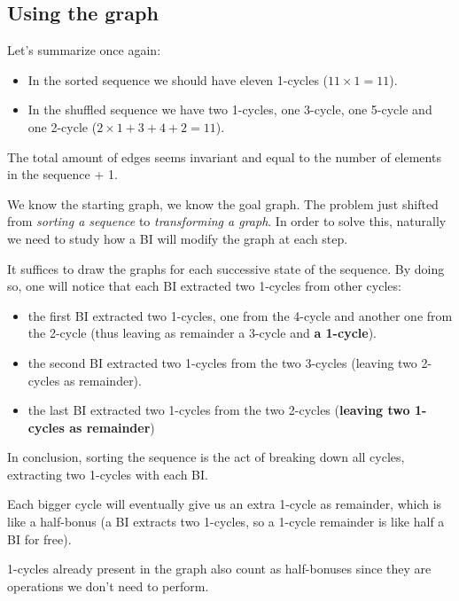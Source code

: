 \documentclass[11pt,final,twoside,nofrench]{thlifl}
\begin{document}
\subsection{Using the graph}

Let's summarize once again:

\begin{itemize}
\item In the sorted sequence we should have eleven 1-cycles ($11 \times 1 = 11$).

\item In the shuffled sequence we have two 1-cycles, one 3-cycle, one 5-cycle and one 2-cycle ($2 \times 1 + 3 + 4 + 2 = 11$).
\end{itemize}

The total amount of edges seems invariant and equal to the number of elements in the sequence + 1.

We know the starting graph, we know the goal graph. The problem just shifted from \emph{sorting a sequence} to \emph{transforming a graph}. In order to solve this, naturally we need to study how a BI will modify the graph at each step.

It suffices to draw the graphs for each successive state of the sequence. By doing so, one will notice that each BI extracted two 1-cycles from other cycles:

\begin{itemize}

\item the first BI extracted two 1-cycles, one from the 4-cycle and another one from the 2-cycle (thus leaving as remainder a 3-cycle and \textbf{a 1-cycle}).

\item the second BI extracted two 1-cycles from the two 3-cycles (leaving two 2-cycles as remainder).

\item the last BI extracted two 1-cycles from the two 2-cycles (\textbf{leaving two 1-cycles as remainder})

\end{itemize}

In conclusion, sorting the sequence is the act of breaking down all cycles, extracting two 1-cycles with each BI.

Each bigger cycle will eventually give us an extra 1-cycle as remainder, which is like a half-bonus (a BI extracts two 1-cycles, so a 1-cycle remainder is like half a BI for free).

1-cycles already present in the graph also count as half-bonuses since they are operations we don't need to perform.
\end{document}
